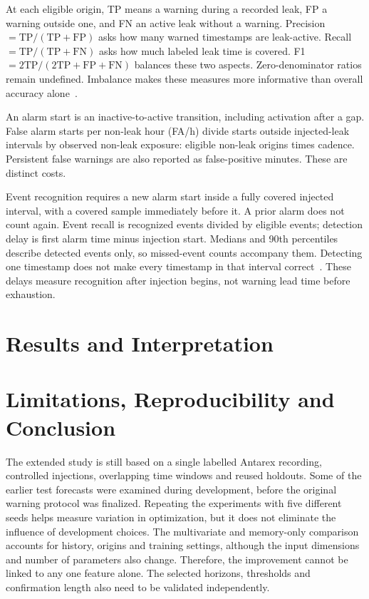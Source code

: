 \documentclass{llncs}
\begin{document}
At each eligible origin, TP means a warning during a recorded leak, FP a warning outside one, and FN an active leak without a warning. Precision $=\mathrm{TP}/(\mathrm{TP+FP})$ asks how many warned timestamps are leak-active. Recall $=\mathrm{TP}/(\mathrm{TP+FN})$ asks how much labeled leak time is covered. F1 $=2\mathrm{TP}/(2\mathrm{TP+FP+FN})$ balances these two aspects. Zero-denominator ratios remain undefined. Imbalance makes these measures more informative than overall accuracy alone~\cite{ref42}.

An alarm start is an inactive-to-active transition, including activation after a gap. False alarm starts per non-leak hour (FA/h) divide starts outside injected-leak intervals by observed non-leak exposure: eligible non-leak origins times cadence. Persistent false warnings are also reported as false-positive minutes. These are distinct costs.

Event recognition requires a new alarm start inside a fully covered injected interval, with a covered sample immediately before it. A prior alarm does not count again. Event recall is recognized events divided by eligible events; detection delay is first alarm time minus injection start. Medians and 90th percentiles describe detected events only, so missed-event counts accompany them. Detecting one timestamp does not make every timestamp in that interval correct~\cite{ref43,ref44}. These delays measure recognition after injection begins, not warning lead time before exhaustion.

\section{Results and Interpretation}


\section{Limitations, Reproducibility and Conclusion}
The extended study is still based on a single labelled Antarex recording, controlled injections, overlapping time windows and reused holdouts. Some of the earlier test forecasts were examined during development, before the original warning protocol was finalized. Repeating the experiments with five different seeds helps measure variation in optimization, but it does not eliminate the influence of development choices. The multivariate and memory-only comparison accounts for history, origins and training settings, although the input dimensions and number of parameters also change. Therefore, the improvement cannot be linked to any one feature alone. The selected horizons, thresholds and confirmation length also need to be validated independently.
\end{document}
